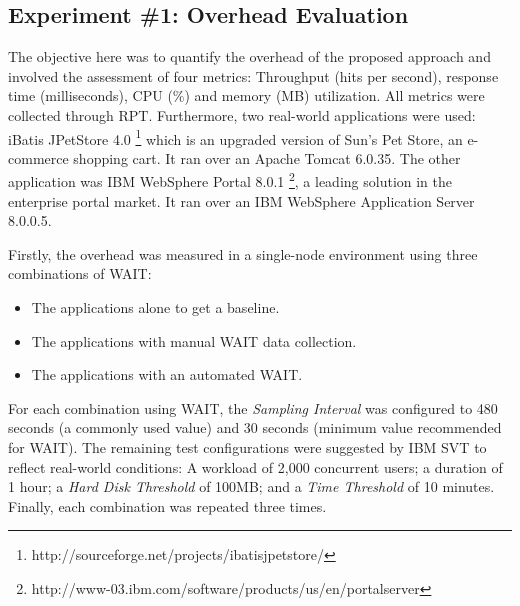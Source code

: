 \documentclass[runningheads,a4paper]{llncs}
\begin{document}
\vspace{-7pt}
\subsection{Experiment \#1: Overhead Evaluation}
\vspace{-7pt}

The objective here was to quantify the overhead of the proposed approach and
involved the assessment of four metrics: Throughput (hits per second), response
time (milliseconds), CPU (\%) and memory (MB) utilization. All metrics were
collected through RPT. Furthermore, two real-world applications were used:
iBatis JPetStore 4.0 \footnote{http://sourceforge.net/projects/ibatisjpetstore/}
which is an upgraded version of Sun's Pet Store, an e-commerce shopping cart. It
ran over an Apache Tomcat 6.0.35. The other application was IBM WebSphere Portal 
8.0.1 \footnote{http://www-03.ibm.com/software/products/us/en/portalserver},
a leading solution in the enterprise portal market. It ran over an IBM WebSphere
Application Server 8.0.0.5.

Firstly, the overhead was measured in a single-node environment using three
combinations of WAIT: 
\vspace{-7pt}
\begin{itemize}
	\item The applications alone to get a baseline.
	\item The applications with manual WAIT data collection.
	\item The applications with an automated WAIT.
\end{itemize}

For each combination using WAIT, the \emph{Sampling Interval} was configured
to 480 seconds (a commonly used value) and 30 seconds (minimum value recommended
for WAIT). The remaining test configurations were suggested by IBM SVT to
reflect real-world conditions: A workload of 2,000 concurrent users; a duration
of 1 hour; a \emph{Hard Disk Threshold} of 100MB; and a \emph{Time Threshold} of
10 minutes. Finally, each combination was repeated three times.
\end{document}
